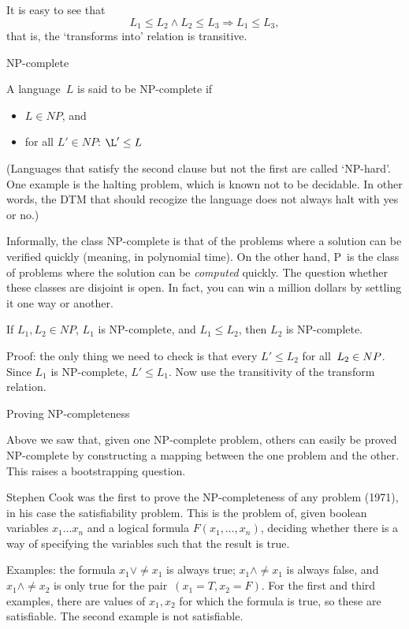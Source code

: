 It is easy to see that 
\[ L_1\leq L_2 \wedge L_2\leq L_3 \Rightarrow L_1\leq L_3, \]
that is, the `transforms into' relation is transitive.

 {NP-complete}

A language~$L$ is said to be NP-complete if
\begin{itemize}
\item $L\in NP$, and
\item for all $L'\in NP$: $\L'\leq L$
\end{itemize}

(Languages that satisfy the second clause but not the first are called
`NP-hard'. One example is the halting problem, which is
known not to be decidable. In other words, the DTM that should
recogize the language does not always halt with yes or no.)

Informally, the class NP-complete is that of the problems where a
solution can be verified quickly (meaning, in polynomial time). On the
other hand, P~is the class of problems where the solution can be
\emph{computed} quickly. The question whether these classes are
disjoint is open. In fact, you can win a million dollars by settling
it one way or another.

\begin{lemma}
If $L_1,L_2\in NP$, $L_1$ is NP-complete, and $L_1\leq L_2$, then
$L_2$ is NP-complete.
\end{lemma}
Proof: the only thing we need to check is that every $L'\leq L_2$ for
all~$L_2\in\nobreak NP$. Since $L_1$ is NP-complete, $L'\leq L_1$. Now
use the transitivity of the transform relation.

 {Proving NP-completeness}

Above we saw that, given one NP-complete problem, others can easily be
proved NP-complete by constructing a mapping between the one problem
and the other. This raises a bootstrapping question.

Stephen Cook was the first to prove the NP-completeness of any problem
(1971), in his case the satisfiability problem. This is the problem
of, given boolean variables $x_1\ldots x_n$ and a logical formula
$F(x_1,\ldots,x_n)$, deciding whether there is a way of specifying the
variables such that the result is true.

Examples: the formula $x_1\vee\neq x_1$ is always true; $x_1\wedge\neq
x_1$ is always false, and $x_1\wedge \neq x_2$ is only true for the
pair~$(x_1=T,x_2=F)$. For the first and third examples, there are
values of $x_1,x_2$ for which the formula is true, so these are
satisfiable. The second example is not satisfiable.

